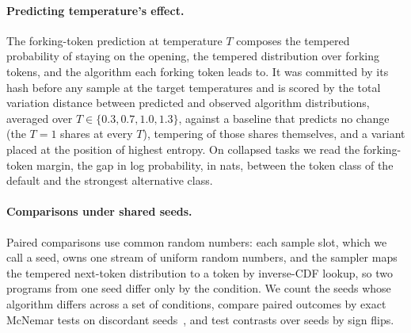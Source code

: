 \documentclass[11pt,letterpaper]{article}
\begin{document}
\paragraph{Predicting temperature's effect.}
The forking-token prediction at temperature $T$ composes the tempered probability of staying on the opening, the tempered distribution over forking tokens, and the algorithm each forking token leads to. It was committed by its hash before any sample at the target temperatures and is scored by the total variation distance between predicted and observed algorithm distributions, averaged over $T \in \{0.3, 0.7, 1.0, 1.3\}$, against a baseline that predicts no change (the $T = 1$ shares at every $T$), tempering of those shares themselves, and a variant placed at the position of highest entropy. On collapsed tasks we read the forking-token margin, the gap in log probability, in nats, between the token class of the default and the strongest alternative class.

\paragraph{Comparisons under shared seeds.}
Paired comparisons use common random numbers: each sample slot, which we call a seed, owns one stream of uniform random numbers, and the sampler maps the tempered next-token distribution to a token by inverse-CDF lookup, so two programs from one seed differ only by the condition. We count the seeds whose algorithm differs across a set of conditions, compare paired outcomes by exact McNemar tests on discordant seeds~\citep{Mcnemar1947}, and test contrasts over seeds by sign flips.
\end{document}
